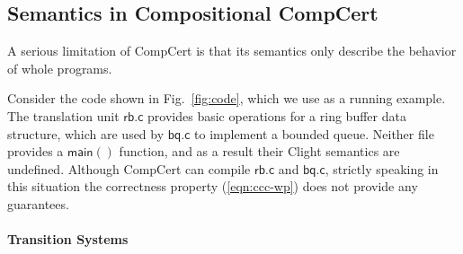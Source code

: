 \documentclass[acmsmall,screen,review,anonymous]{acmart}
\newcommand{\kw}[1]{\ensuremath{ \mathsf{#1} }}
\begin{document}
\subsection{Semantics in Compositional CompCert} \label{sec:survey:compcomp} %

A serious limitation of CompCert
is that its semantics
only describe the behavior of whole programs.

Consider the code shown in Fig.~\ref{fig:code},
which we use as a running example.
The translation unit $\kw{rb.c}$
provides basic operations for a ring buffer data structure,
which are used by $\kw{bq.c}$
to implement a bounded queue.
Neither file provides a $\kw{main}()$ function,
and as a result their Clight semantics are undefined.
Although CompCert can compile $\kw{rb.c}$ and $\kw{bq.c}$,
strictly speaking in this situation
the correctness property (\ref{eqn:ccc-wp})
does not provide any guarantees.

\paragraph{Transition Systems} %
\end{document}
